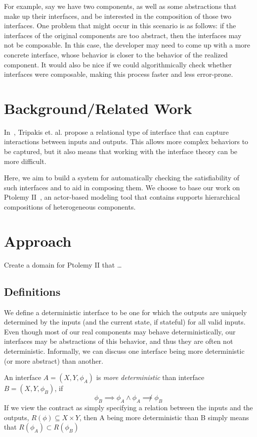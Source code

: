 \documentclass[preprint,11pt,authoryear]{sigplanconf}
\begin{document}
For example, say we have two components, as well as some abstractions that make up their interfaces, and be interested in the composition of those two interfaces.  One problem that might occur in this scenario is as follows: if the interfaces of the original components are too abstract, then the interfaces may not be composable.  In this case, the developer may need to come up with a more concrete interface, whose behavior is closer to the behavior of the realized component.  It would also be nice if we could algorithmically check whether interfaces were composable, making this process faster and less error-prone.

\section{Background/Related Work}
In~\cite{relationalInterfaces}, Tripakis et. al. propose a relational type of interface that can capture interactions between inputs and outputs.  This allows more complex behaviors to be captured, but it also means that working with the interface theory can be more difficult.

Here, we aim to build a system for automatically checking the satisfiability of such interfaces and to aid in composing them.  We choose to base our work on Ptolemy II~\cite{ptII}, an actor-based modeling tool that contains supports hierarchical compositions of heterogeneous components.

\section{Approach}
Create a domain for Ptolemy II that \dots

\subsection{Definitions}
We define a deterministic interface to be one for which the outputs are uniquely determined by the inputs (and the current state, if stateful) for all valid inputs.  Even though most of our real components may behave deterministically, our interfaces may be abstractions of this behavior, and thus they are often not deterministic.  Informally, we can discuss one interface being more deterministic (or more abstract) than another.

An interface $A=(X,Y,\phi_A)$ is \emph{more deterministic} than interface $B=(X,Y,\phi_B)$, if
\[
\phi_B \implies \phi_A \wedge \phi_A \not\implies \phi_B
\]
If we view the contract as simply specifying a relation between the inputs and the outputs, $R(\phi) \subseteq X \times Y$, then A being more deterministic than B simply means that
$R(\phi_A) \subset R(\phi_B)$
\end{document}
